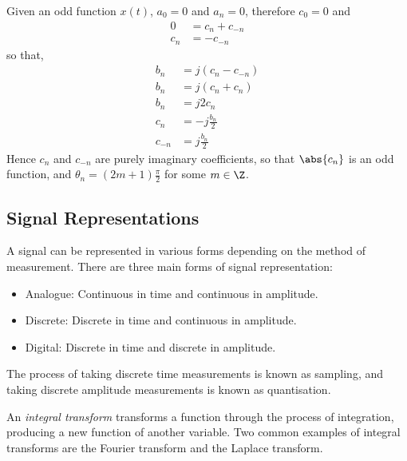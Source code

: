 \documentclass{article}
\begin{document}
Given an odd function \(x\left( t \right)\), \(a_0 = 0\) and \(a_n = 0\), therefore \(c_0 = 0\) and
\begin{align*}
    0   & = c_n + c_{-n} \\
    c_n & = -c_{-n}
\end{align*}
so that,
\begin{align*}
    b_n    & = j \left( c_n - c_{-n} \right) \\
    b_n    & = j \left( c_n + c_n \right)    \\
    b_n    & = j 2 c_n                       \\
    c_n    & = -j \frac{b_n}{2}              \\
    c_{-n} & = j \frac{b_n}{2}
\end{align*}
Hence \(c_n\) and \(c_{-n}\) are purely imaginary coefficients, so that \(\abs{c_n}\) is an odd function, and \(\theta_n = \left( 2m + 1 \right) \frac{\pi}{2}\) for some \(m \in \Z\).
\subsection{Signal Representations}
A signal can be represented in various forms depending on the method of measurement. There are three main forms of signal representation:
\begin{itemize}
    \item Analogue: Continuous in time and continuous in amplitude.
    \item Discrete: Discrete in time and continuous in amplitude.
    \item Digital: Discrete in time and discrete in amplitude.
\end{itemize}
The process of taking discrete time measurements is known as sampling, and taking discrete amplitude measurements is known as quantisation.
\begin{definition}
    An \textit{integral transform} transforms a function through the process of integration, producing a new function of another variable.
    Two common examples of integral transforms are the Fourier transform and the Laplace transform.
\end{definition}
\end{document}
